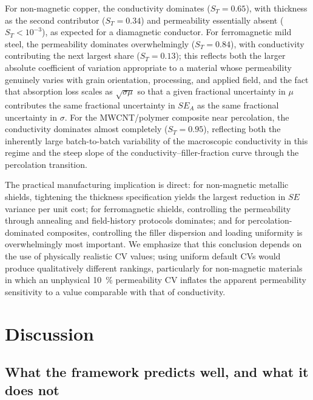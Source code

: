 \documentclass[review,3p,authoryear]{elsarticle}
\begin{document}
For non-magnetic copper, the conductivity dominates ($S_T = 0.65$), with thickness as the second contributor ($S_T = 0.34$) and permeability essentially absent ($S_T < 10^{-3}$), as expected for a diamagnetic conductor. For ferromagnetic mild steel, the permeability dominates overwhelmingly ($S_T = 0.84$), with conductivity contributing the next largest share ($S_T = 0.13$); this reflects both the larger absolute coefficient of variation appropriate to a material whose permeability genuinely varies with grain orientation, processing, and applied field, and the fact that absorption loss scales as $\sqrt{\sigma\mu}$ so that a given fractional uncertainty in $\mu$ contributes the same fractional uncertainty in $SE_A$ as the same fractional uncertainty in $\sigma$. For the MWCNT/polymer composite near percolation, the conductivity dominates almost completely ($S_T = 0.95$), reflecting both the inherently large batch-to-batch variability of the macroscopic conductivity in this regime and the steep slope of the conductivity--filler-fraction curve through the percolation transition.

The practical manufacturing implication is direct: for non-magnetic metallic shields, tightening the thickness specification yields the largest reduction in $SE$ variance per unit cost; for ferromagnetic shields, controlling the permeability through annealing and field-history protocols dominates; and for percolation-dominated composites, controlling the filler dispersion and loading uniformity is overwhelmingly most important. We emphasize that this conclusion depends on the use of physically realistic CV values; using uniform default CVs would produce qualitatively different rankings, particularly for non-magnetic materials in which an unphysical \SI{10}{\percent} permeability CV inflates the apparent permeability sensitivity to a value comparable with that of conductivity.

\section{Discussion}
\label{sec:discussion}

\subsection{What the framework predicts well, and what it does not}
\end{document}
